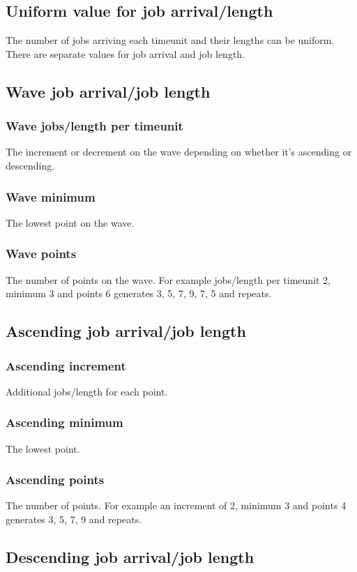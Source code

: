 \documentclass[11pt,oneside,a4paper]{article}
\begin{document}
\subsection{Uniform value for job arrival/length}
The number of jobs arriving each timeunit and their lengths can be uniform. There are separate values for job arrival and job length.

\subsection{Wave job arrival/job length}
\subsubsection{Wave jobs/length per timeunit}
The increment or decrement on the wave depending on whether it's ascending or descending.
\subsubsection{Wave minimum}
The lowest point on the wave.
\subsubsection{Wave points}
The number of points on the wave. For example jobs/length per timeunit 2, minimum 3 and points 6 generates 3, 5, 7, 9, 7, 5 and repeats.

\subsection{Ascending job arrival/job length}
\subsubsection{Ascending increment}
Additional jobs/length for each point.
\subsubsection{Ascending minimum}
The lowest point.
\subsubsection{Ascending points}
The number of points. For example an increment of 2, minimum 3 and points 4 generates 3, 5, 7, 9 and repeats.

\subsection{Descending job arrival/job length}
\end{document}
